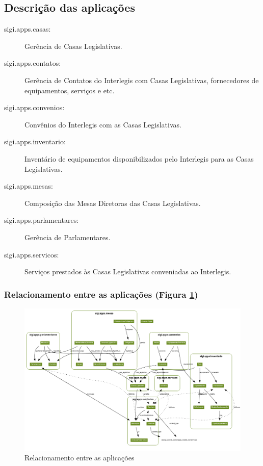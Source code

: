 \subsection{Descrição das aplicações}
\label{sec:apps}
\begin{description}
\item[sigi.apps.casas:]
  Gerência de Casas Legislativas.

\item[sigi.apps.contatos:]
  Gerência de Contatos do Interlegis com Casas Legislativas,
  fornecedores de equipamentos, serviços e etc.

\item[sigi.apps.convenios:]
  Convênios do Interlegis com as Casas Legislativas.

\item[sigi.apps.inventario:]
  Inventário de equipamentos disponibilizados pelo Interlegis para as
  Casas Legislativas.

\item[sigi.apps.mesas:]
  Composição das Mesas Diretoras das Casas Legislativas.

\item[sigi.apps.parlamentares:]
  Gerência de Parlamentares.

\item[sigi.apps.servicos:]
  Serviços prestados às Casas Legislativas conveniadas ao Interlegis.
\end{description}

\subsubsection{Relacionamento entre as aplicações (Figura \ref{fig:apps})}

\begin{figure}[p]
  \centering
  \includegraphics[angle=90,width=130mm]{../imagens/apps.png}
  \caption{Relacionamento entre as aplicações}
  \label{fig:apps}
\end{figure}


%
%
